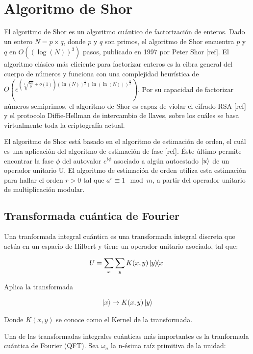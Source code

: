 \chapter{Algoritmo de Shor}

El algoritmo de Shor es un algoritmo cuántico de factorización de enteros. Dado un entero $N=p \times q$, donde $p$ y $q$ son primos, el algoritmo de Shor encuentra $p$ y $q$ en $O((\log(N))^3)$ pasos, publicado en 1997 por Peter Shor [ref]. El algoritmo clásico más eficiente para factorizar enteros es la cibra general del cuerpo de números y funciona con una complejidad heurística de $O(e^{(\sqrt[3]{\frac{64}{9}}+o(1))(\ln(N))^{\frac{1}{3}}(\ln(\ln(N)))^{\frac{2}{3}}})$. Por su capacidad de factorizar números semiprimos, el algoritmo de Shor es capaz de violar el cifrado RSA [ref] y el protocolo Diffie-Hellman de intercambio de llaves, sobre los cuáles se basa virtualmente toda la criptografía actual.

El algoritmo de Shor está basado en el algoritmo de estimación de orden, el cuál es una aplicación del algoritmo de estimación de fase [ref]. Éste último permite encontrar la fase $\phi$ del autovalor $e^{i \phi}$ asociado a algún autoestado $\ket{u}$ de un operador unitario U. El algoritmo de estimación de orden utiliza esta estimación para hallar el orden $r>0$ tal que $a^r \equiv 1 \mod m$, a partir del operador unitario de multiplicación modular.

\section{Transformada cuántica de Fourier}

Una tranformada integral cuántica es una transformada integral discreta que actúa en un espacio de Hilbert y tiene un operador unitario asociado, tal que:

\begin{equation}
    U = \sum\limits_x\sum\limits_y K(x,y) \ketbra{y}{x}
\end{equation}

Aplica la transformada

\begin{equation}
    \ket{x} \rightarrow K(x,y) \ket{y}
\end{equation}

Donde $K(x,y)$ se conoce como el Kernel de la transformada.

Una de las transformadas integrales cuánticas más importantes es la tranformada cuántica de Fourier (QFT). Sea $\omega_n$ la n-ésima raíz primitiva de la unidad:

